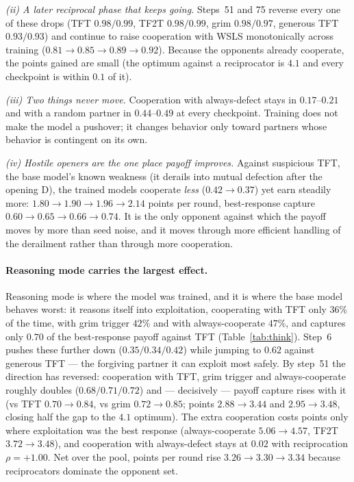 \documentclass{article}
\begin{document}
\emph{(ii) A later reciprocal phase that keeps going.} Steps~51 and 75 reverse
every one of these drops (TFT $0.98/0.99$, TF2T $0.98/0.99$, grim $0.98/0.97$,
generous TFT $0.93/0.93$) and continue to raise cooperation with WSLS
monotonically across training ($0.81\to0.85\to0.89\to0.92$). Because the
opponents already cooperate, the points gained are small (the optimum against a
reciprocator is $4.1$ and every checkpoint is within $0.1$ of it).

\emph{(iii) Two things never move.} Cooperation with always-defect stays in
$0.17$--$0.21$ and with a random partner in $0.44$--$0.49$ at every checkpoint.
Training does not make the model a pushover; it changes behavior only toward
partners whose behavior is contingent on its own.

\emph{(iv) Hostile openers are the one place payoff improves.} Against
suspicious TFT, the base model's known weakness (it derails into mutual
defection after the opening D), the trained models cooperate \emph{less}
($0.42\to0.37$) yet earn steadily more: $1.80\to1.90\to1.96\to2.14$ points per
round, best-response capture $0.60\to0.65\to0.66\to0.74$. It is the only
opponent against which the payoff moves by more than seed noise, and it moves
through more efficient handling of the derailment rather than through more
cooperation.

\paragraph{Reasoning mode carries the largest effect.}
Reasoning mode is where the model was trained, and it is where the base model
behaves worst: it reasons itself into exploitation, cooperating with TFT only
$36\%$ of the time, with grim trigger $42\%$ and with always-cooperate $47\%$,
and captures only $0.70$ of the best-response payoff against TFT
(Table~\ref{tab:think}). Step~6 pushes these further down ($0.35/0.34/0.42$)
while jumping to $0.62$ against generous TFT --- the forgiving partner it can
exploit most safely. By step~51 the direction has reversed: cooperation with
TFT, grim trigger and always-cooperate roughly doubles ($0.68/0.71/0.72$) and
--- decisively --- payoff capture rises with it (vs TFT $0.70\to0.84$, vs
grim $0.72\to0.85$; points $2.88\to3.44$ and $2.95\to3.48$, closing half the gap
to the $4.1$ optimum). The extra cooperation costs points only where
exploitation was the best response (always-cooperate $5.06\to4.57$, TF2T
$3.72\to3.48$), and cooperation with always-defect stays at $0.02$ with
reciprocation $\rho=+1.00$. Net over the pool, points per round rise
$3.26\to3.30\to3.34$ because reciprocators dominate the opponent set.
\end{document}
